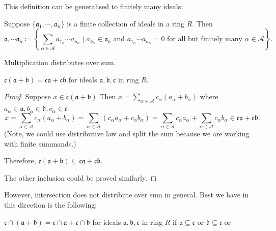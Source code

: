 This definition can be generalised to finitely many ideals:
\begin{definition}
    Suppose \(\{\mathfrak{a}_1, \cdots, \mathfrak{a}_n\}\) is a finite collection of ideals in a ring \(R\). Then
    \[
        \mathfrak{a_1}\cdots \mathfrak{a}_n \coloneq  \left\{\sum_{\alpha \in \mathcal{A}} a_{1_\alpha }\cdots a_{n_\alpha } \mid a_{k_\alpha } \in \mathfrak{a}_k \text{ and } a_{1_\alpha }\cdots a_{n_\alpha } = 0 \text{ for all but finitely many } \alpha \in \mathcal{A} \right\}.
        \]
\end{definition}
Multiplication distributes over sum. 
\begin{lemma} 
\(\mathfrak{c} (\mathfrak{a} + \mathfrak{b}) = \mathfrak{c}\mathfrak{a} + \mathfrak{cb}\) for ideals \(\mathfrak{a}, \mathfrak{b}, \mathfrak{c}\) in ring \(R\).
\end{lemma}
\begin{proof}
    Suppose \(x \in \mathfrak{c}(\mathfrak{a}+\mathfrak{b})\) Then \(x = \sum_{\alpha \in \mathcal{A}} c_\alpha (a_\alpha + b_\alpha)\) where \(a_\alpha \in \mathfrak{a}, b_\alpha \in \mathfrak{b}, c_\alpha \in \mathfrak{c}\)
    \[
        x = \sum_{\alpha \in \mathcal{A}} c_\alpha (a_\alpha + b_\alpha) = \sum_{\alpha \in \mathcal{A}} (c_\alpha a_\alpha + c_\alpha b_\alpha) = \sum_{\alpha \in \mathcal{A}} c_\alpha a_\alpha +  \sum_{\alpha \in \mathcal{A}} c_\alpha b_\alpha \in \mathfrak{ca}+ \mathfrak{cb}.
    \]
    (Note, we could use distributive law and split the sum because we are working with finite summands.)

    Therefore, \(\mathfrak{c} (\mathfrak{a} + \mathfrak{b}) \subseteq \mathfrak{c}\mathfrak{a} + \mathfrak{cb}\).

    The other inclusion could be proved similarly. 
\end{proof}
However, intersection does not distribute over sum in general. Best we have in this direction is the following:
\begin{lemma} 
    \(\mathfrak{c} \cap (\mathfrak{a} + \mathfrak{b}) = \mathfrak{c} \cap \mathfrak{a} + \mathfrak{c} \cap \mathfrak{b}\) for ideals \(\mathfrak{a}, \mathfrak{b}, \mathfrak{c}\) in ring \(R\) if \(\mathfrak{a} \subseteq \mathfrak{c}\) or \(\mathfrak{b} \subseteq \mathfrak{c}\) or 
\end{lemma}
